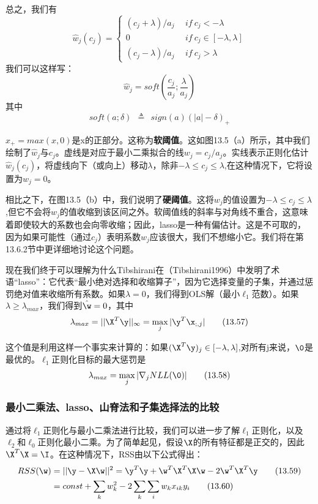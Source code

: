 \documentclass[a4paper]{article}
\begin{document}
总之，我们有
\begin{equation}
	\hat{w}_j(c_j)=\left\{
	\begin{array}{cl}
	(c_j+\lambda)/a_j\ \ &if\  c_j<-\lambda\\
	0&if\  c_j\in [-\lambda,\lambda]\\
	(c_j-\lambda)/a_j\ \ &if\  c_j>\lambda
	\end{array} \right.\tag{13.54}
\end{equation}
我们可以这样写：
\begin{equation}
	\hat{w}_j=soft(\frac{c_j}{a_j};\frac{\lambda}{a_j})\tag{13.55}
\end{equation}
其中
\begin{equation}
	soft(a;\delta)\ \ \triangleq\ \ sign(a)(|a|-\delta)_+\tag{13.56}
\end{equation}

$x_+=max(x,0)$是x的正部分。这称为\textbf{软阈值}。这如图13.5（a）所示，其中我们绘制了$\hat{w}_j$与$c_j$。虚线是对应于最小二乘拟合的线$w_j=c_j/a_j$。实线表示正则化估计$\hat{w}_j(c_j)$，将虚线向下（或向上）移动$\lambda$，除非$-\lambda\le c_j\le \lambda$,在这种情况下，它将设置为$w_j=0$。

相比之下，在图13.5（b）中，我们说明了\textbf{硬阈值}。这将$w_j$的值设置为$-\lambda\le c_j\le \lambda$,但它不会将$w_j$的值收缩到该区间之外。软阈值线的斜率与对角线不重合，这意味着即使较大的系数也会向零收缩；因此，lasso是一种有偏估计。这是不可取的，因为如果可能性（通过$c_j$）表明系数$w_j$应该很大，我们不想缩小它。我们将在第13.6.2节中更详细地讨论这个问题。

现在我们终于可以理解为什么Tibshirani在（Tibshirani1996）中发明了术语“lasso”：它代表“最小绝对选择和收缩算子”，因为它选择变量的子集，并通过惩罚绝对值来收缩所有系数。如果$\lambda=0$，我们得到OLS解（最小$\ell_1$范数）。如果$\lambda\ge \lambda_{max}$，我们得到$\hat{\w}=0$，其中
\begin{equation}
	\lambda_{max}=||\X^T\y||_\infty=\max_j|\y^T\x_{;,j}|\tag{13.57}
\end{equation}

这个值是利用这样一个事实来计算的：如果$(\X^T\y)_j\in [-\lambda,\lambda]$,对所有j来说，$\0$是最优的。$\ell_1$正则化目标的最大惩罚是
\begin{equation}
	\lambda_{max}=\max_j|\nabla_jNLL(\0)|\tag{13.58}
\end{equation}

\subsubsection{最小二乘法、lasso、山脊法和子集选择法的比较}
通过将$\ell_1$正则化与最小二乘法进行比较，我们可以进一步了解$\ell_1$正则化，以及$\ell_2$和$\ell_0$正则化最小二乘。为了简单起见，假设$\X$的所有特征都是正交的，因此$\X^T\X=\I$。在这种情况下，RSS由以下公式得出：
\begin{align}
	RSS(\w)&=||\y-\X\w||^2=\y^T\y+\w^T\X^T\X\w-2\w^T\X^T\y\tag{13.59}\\
	&=const+\sum_{k}w_k^2-2\sum_{k}\sum_{i}w_kx_{ik}y_i\tag{13.60}
\end{align}
\end{document}
